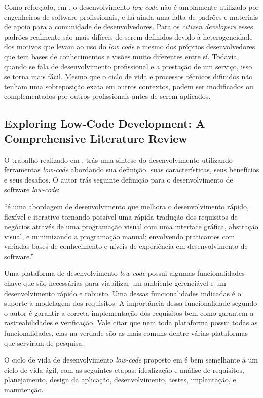 {		Como reforçado, em \cite{LowCodeLifeCicle}, o desenvolvimento \textit{low code} não é amplamente utilizado por engenheiros de software profissionais, e há ainda uma falta de padrões e
		materiais de apoio para a comunidade de desenvolvedores. Para os \textit{citizen developers} esses padrões realmente são mais difíceis de serem definidos devido à heterogeneidade dos
		motivos que levam ao uso do \textit{low code} e mesmo dos próprios desenvolvedores que tem bases de conhecimentos e visões muito diferentes entre sí. Todavia, quando se fala de desenvolvimento
		profissional e a prestação de um serviço, isso se torna mais fácil. Mesmo que o ciclo de vida e processos técnicos difinidos não tenham uma sobreposição exata em outros contextos, podem 
		ser modificados ou complementados por outros profissionais antes de serem aplicados.
		
		\subsection{Exploring Low-Code Development: A Comprehensive Literature Review}

		O trabalho realizado em \cite{LowCodeExploring}, trás uma sintese do desenvolvimento utilizando
		ferramentas \textit{low-code} abordando sua definição, suas características, seus benefícios e seus desafios.
		O autor trás seguinte definição para o desenvolvimento de software \textit{low-code}:

		``é uma abordagem de desenvolvimento que melhora o desenvolvimento rápido, flexível e iterativo tornando possível
		uma rápida tradução dos requisitos de negócios através de uma programação visual com uma interface gráfica, abstração visual, 
		e minimizando a programação manual; envolvendo praticantes com variadas bases de conhecimento e níveis de experiência em 
		desenvolvimento de software.''

		Uma plataforma de desenvolvimento \textit{low-code} possui algumas funcionalidades chave que são necessárias para viabilizar um 
		ambiente gerenciável e um desenvolvimento rápido e robusto. Uma dessas funcionalidades indicadas é o suporte à modelagem dos requisitos. A importância dessa funcionalidade segundo 
		o autor é garantir a correta implementação dos requisitos bem como garantem a rastreabilidades e verificação. Vale citar que nem toda plataforma possui todas as funcionalidades, elas na 
		verdade são as mais comuns dentre várias plataformas que serviram de pesquisa.

		O ciclo de vida de desenvolvimento \textit{low-code} proposto em \cite{LowCodeExploring} é bem semelhante a um ciclo de vida ágil, com as seguintes etapas: idealização e análise 
		de requisitos, planejamento, design da aplicação, desenvolvimento, testes, implantação, e manutenção.

}
